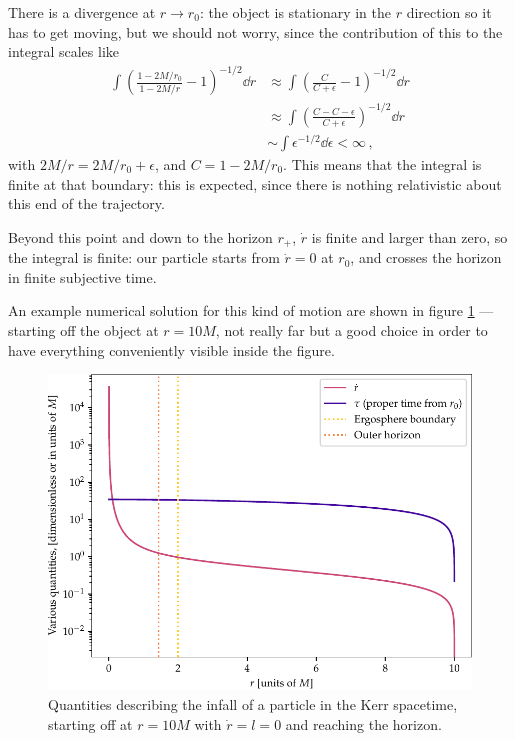 \documentclass[main.tex]{subfiles}
\begin{document}
There is a divergence at \(r \to r_0 \): the object is stationary in the \(r\) direction so it has to get moving, but we should not worry, since the contribution of this to the integral scales like 
%
\begin{align}
\int \left(\frac{1 - 2M / r_0 }{1 - 2M / r} -1 \right)^{-1/2} \dd{r} &\approx \int \left(\frac{C }{C+ \epsilon } -1 \right)^{-1/2} \dd{r}  \\
&\approx \int \left(\frac{C - C - \epsilon }{C + \epsilon } \right)^{-1/2} \dd{r}  \\
&\sim \int \epsilon^{-1/2} \dd{\epsilon } < \infty 
\,,
\end{align}
%
with \(2M/r = 2M/r_0 + \epsilon \), and \(C = 1 - 2M/r_0 \).
This means that the integral is finite at that boundary: this is expected, since there is nothing relativistic about this end of the trajectory.

Beyond this point and down to the horizon \(r_+\), \(\dot{r}\) is finite and larger than zero, so the integral is finite: our particle starts from \(\dot{r} = 0\) at \(r_0 \), and crosses the horizon in finite subjective time.



An example numerical solution for this kind of motion are shown in figure \ref{fig:kerr_infall} --- starting off the object at \(r = 10M\), not really far but a good choice in order to have everything conveniently visible inside the figure.

\begin{figure}[ht]
\centering
\includegraphics[width=.9\textwidth]{figures/kerr_infall}
\caption{Quantities describing the infall of a particle in the Kerr spacetime, starting off at \(r = 10M\) with \(\dot{r} = l = 0\) and reaching the horizon.}
\label{fig:kerr_infall}
\end{figure}
\end{document}
